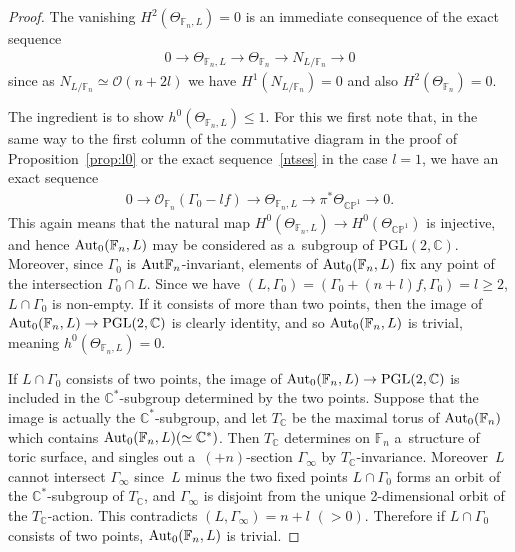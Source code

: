 \begin{proof}
The vanishing $H^2 (\Theta_{\mathbb{F}_n, L}) =0$ is an immediate consequence of the exact sequence
\begin{gather}
\label{ses:56}
0
\longrightarrow
\Theta_{\mathbb{F}_n,L}
\longrightarrow
\Theta_{\mathbb{F}_n}
\longrightarrow
N_{L/\mathbb{F}_n}
\longrightarrow
0
\end{gather}
since as $N_{L/\mathbb{F}_n}\simeq\mathscr O(n+2l)$ we have $H^1(N_{L/\mathbb{F}_n}) = 0$ and also
$H^2(\Theta_{\mathbb{F}_n}) =0$.

{\sloppy The ingredient is to show $h^0(\Theta_{\mathbb{F}_n, L}) \le 1$.
For this we f\/irst note that, in the same way to the f\/irst column of the commutative diagram in the proof of
Proposition~\ref{prop:l0} or the exact sequence~\eqref{ntses} in the case $l=1$, we have an exact sequence
\begin{gather*}%
0
\longrightarrow
\mathscr O_{\mathbb{F}_n} (\Gamma_0 - lf )
\longrightarrow
\Theta_{\mathbb{F}_n,L}
\longrightarrow
\pi^*\Theta_{\mathbb{CP}^1}
\longrightarrow
0.
\end{gather*}
This again means that the natural map $H^0(\Theta_{\mathbb{F}_n,L} ) \to H^0(\Theta_{\mathbb{CP}^1})$ is injective, and
hence ${\rm{Aut}}_0(\mathbb{F}_n,L)$ may be considered as a~subgroup of $\mathrm{PGL}(2,\mathbb{C})$.
Moreover, since $\Gamma_0$ is ${\rm{Aut}}\mathbb{F}_n$-invariant, ele\-ments of ${\rm{Aut}}_0(\mathbb{F}_n,L)$ f\/ix any
point of the intersection $\Gamma_0\cap L$.
Since we have $(L,\Gamma_0)=(\Gamma_0 + (n+l)f,\Gamma_0) = l\ge 2$, $L\cap \Gamma_0$ is non-empty.
If it consists of more than two points, then the image of ${\rm{Aut}}_0(\mathbb{F}_n,L)\to \mathrm{PGL}(2,\mathbb{C})$
is clearly identity, and so ${\rm{Aut}}_0(\mathbb{F}_n,L)$ is trivial, meaning $h^0(\Theta_{\mathbb{F}_n,L})=0$.

}

If $L\cap \Gamma_0$ consists of two points, the image of ${\rm{Aut}}_0(\mathbb{F}_n,L)\to \mathrm{PGL}(2,\mathbb{C})$ is
included in the $\mathbb{C}^*$-subgroup determined by the two points.
Suppose that the image is actually the $\mathbb{C}^*$-subgroup, and let $T_{\mathbb{C}}$ be the maximal torus of
${\rm{Aut}}_0(\mathbb{F}_n)$ which contains ${\rm{Aut}}_0(\mathbb{F}_n,L)(\simeq \mathbb{C}^*)$.
Then $T_{\mathbb{C}}$ determines on $\mathbb{F}_n$ a~structure of toric surface, and singles out a~$(+n)$-section
$\Gamma_{\infty}$ by $T_{\mathbb{C}}$-invariance.
Moreover~$L$ cannot intersect $\Gamma_{\infty}$ since~$L$ minus the two f\/ixed points $L\cap\Gamma_0$ forms an orbit of
the $\mathbb{C}^*$-subgroup of $T_{\mathbb{C}}$, and $\Gamma_{\infty}$ is disjoint from the unique 2-dimensional orbit
of the $T_{\mathbb{C}}$-action.
This contradicts $(L,\Gamma_{\infty})=n+l$ $(>0)$.
Therefore if $L\cap \Gamma_0$ consists of two points, ${\rm{Aut}}_0(\mathbb{F}_n,L)$ is trivial.


\end{proof}
